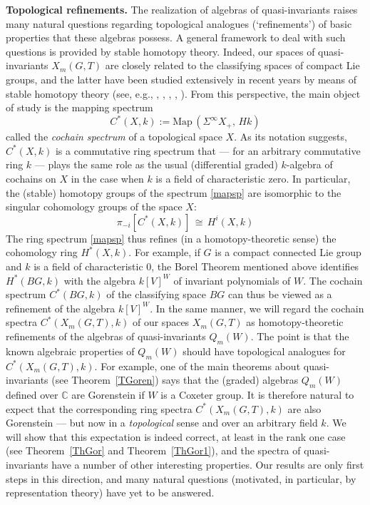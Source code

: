 \documentclass[11pt]{amsart}
\theoremstyle{definition}
\theoremstyle{remark}
\numberwithin{equation}{section}
\newcommand{\la}{\label}
\newcommand{\Map}{\mathrm{Map}}
\def\C{\mathbb C}
\begin{document}
\vspace*{1ex}

\noindent
{\bf Topological refinements.}
The realization of algebras of quasi-invariants raises many natural questions regarding topological analogues (`refinements') of basic properties that these algebras possess. A general framework to deal with such questions is provided by stable homotopy theory. Indeed, our spaces of quasi-invariants  $ X_m(G,T)$ are closely related to the classifying spaces of compact Lie groups, and the latter have been studied extensively in recent years by means of stable homotopy theory (see, e.g., \cite{DGI06}, \cite{BG14},  \cite{G18}, \cite{G20}, \cite{BCHV21}). From this perspective, the main object of study is the mapping spectrum  
%
\begin{equation}\la{mapsp}
C^*(X, k) := \Map\,(\Sigma^{\infty} X_{+},\,H k)  
\end{equation}
%
called the {\it cochain spectrum} of a topological space $X$. As its notation suggests, $ C^*(X,k) $  is a commutative ring spectrum that --- for an arbitrary commutative ring $k$ --- plays the same role as the usual (differential graded) $k$-algebra of cochains on $X$ in the case when $k$ is a field of characteristic zero. In particular, the (stable) homotopy groups of the spectrum \eqref{mapsp} are isomorphic to the singular cohomology groups of the space $X$:
%
$$
\pi_{-i}[C^*(X, k)]\,\cong\, H^{i}(X, k)
$$
%
The ring spectrum \eqref{mapsp} thus refines (in a homotopy-theoretic sense) the cohomology ring $H^*(X,k)$. For example,
if $G$ is a compact connected Lie group and $k$ is a field of characteristic $0$, the Borel Theorem mentioned above identifies $ H^\ast(BG, k) $ with the
algebra $ k[V]^W $ of invariant polynomials of $W$. The cochain spectrum $ C^*(BG, k) $  of the classifying space $BG$ can thus be viewed as a refinement of the algebra $ k[V]^W $. In the same manner,  we will regard the cochain spectra $ C^*(X_m(G,T), k) $ of our spaces $ X_m(G,T) $  as  homotopy-theoretic refinements of the algebras of quasi-invariants $ Q_m(W) $. The point is that the known algebraic properties of $ Q_m(W) $ should have topological analogues for $ C^*(X_m(G,T), k) $. For example, one of the main theorems about quasi-invariants (see Theorem~\ref{TGoren}) says that the (graded) algebras $ Q_m(W) $ defined over $\C$ are Gorenstein if $W$ is a Coxeter group. It is therefore natural to expect that the corresponding ring spectra $ C^*(X_m(G,T), k) $ are also Gorenstein --- but now in a {\it topological} sense \cite{DGI06} and over an arbitrary field $k$. We will show that this expectation is indeed correct, at least in the rank one case (see Theorem~\ref{ThGor} and Theorem~\ref{ThGor1}), and the spectra of quasi-invariants have a number of other interesting properties. Our results are only first steps in this direction, and many natural questions (motivated, in particular, by representation theory) have yet to be answered.
\end{document}
